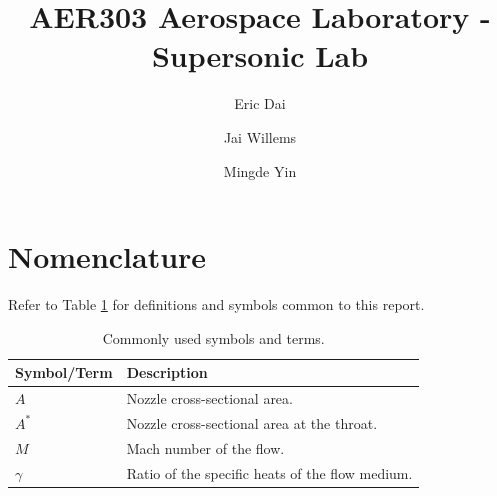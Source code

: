 \documentclass[runningheads]{llncs}
\begin{document}
\title{AER303 Aerospace Laboratory - Supersonic Lab}

\author{Eric Dai \and Jai Willems \and Mingde Yin}


\maketitle




\begin{abstract}


\end{abstract}




\newpage
\section{Nomenclature}

Refer to Table \ref{tab:nomenclature} for definitions and symbols common to this report.

\begin{table}[h]
    \centering
    \begin{tabular}{p{4.5cm}p{11cm}}
        \toprule
        Symbol/Term & Description \\
        \midrule
        $A$ & Nozzle cross-sectional area. \\
        $A^*$ & Nozzle cross-sectional area at the throat. \\
        $M$ & Mach number of the flow. \\
        $\gamma$ & Ratio of the specific heats of the flow medium. \\
        \bottomrule
    \end{tabular}
    \caption{Commonly used symbols and terms.}
    \label{tab:nomenclature}
\end{table}
\end{document}
